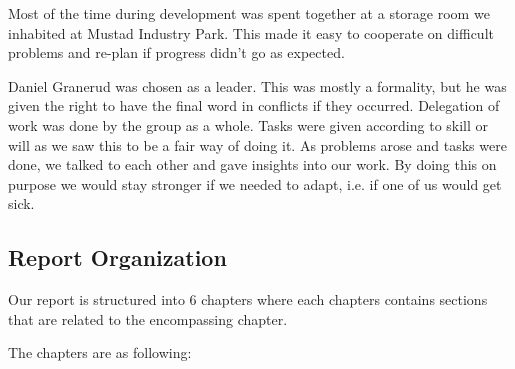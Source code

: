 Most of the time during development was spent together at a storage room we
inhabited at Mustad Industry Park. This made it easy to cooperate on difficult
problems and re-plan if progress didn’t go as expected.

Daniel Granerud was chosen as a leader. This was mostly a formality, but he was
given the right to have the final word in conflicts if they occurred.
Delegation of work was done by the group as a whole. Tasks were given according
to skill or will as we saw this to be a fair way of doing it. As problems
arose and tasks were done, we talked to each other and gave insights into our
work. By doing this on purpose we would stay stronger if we needed to adapt,
i.e. if one of us would get sick.


\subsection{Report Organization}
\label{subsec:report_organization}

Our report is structured into 6 chapters where each chapters contains sections that are related to the encompassing chapter.

The chapters are as following:

